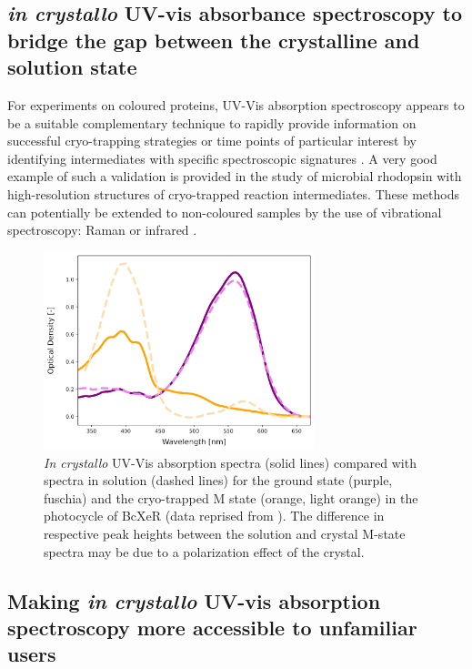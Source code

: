 \subsection{\textit{in crystallo} UV-vis absorbance spectroscopy to bridge the gap between the crystalline and solution state}
For experiments on coloured proteins, UV-Vis absorption spectroscopy appears to be a suitable complementary technique to rapidly provide information on successful cryo-trapping strategies or time points of particular interest by identifying intermediates with specific spectroscopic signatures \parencite{vonstettenCrystalloOpticalSpectroscopy2015,makitaCombiningOnlineSpectroscopy2023}. A very good example of such a validation is provided in the study of microbial rhodopsin with high-resolution structures of cryo-trapped reaction intermediates. These methods can potentially be extended to non-coloured samples by the use of vibrational spectroscopy: Raman \parencite{buiDirectEvidencePeroxide2014} or infrared \parencite{nomuraShortlivedIntermediateN2O2021,mousDynamicsMechanismLightdriven2022}. 

\begin{figure}[H] %
    \centering
    \noindent \includegraphics[width=0.7\textwidth]{images/Introduction/Figure2.pdf}
    \hfill
    \caption{\textit{In crystallo} UV-Vis absorption spectra (solid lines) compared with spectra in solution (dashed lines) for the ground state (purple, fuschia) and the cryo-trapped M state (orange, light orange) in the photocycle of BcXeR (data reprised from \cite{kovalevMechanismsInwardTransmembrane2023}). The difference in respective peak heights between the solution and crystal M-state spectra may be due to a polarization effect of the crystal.}
    \label{fig:Figure2}
\end{figure}

\subsection{Making \textit{in crystallo} UV-vis absorption spectroscopy more accessible to unfamiliar users}

